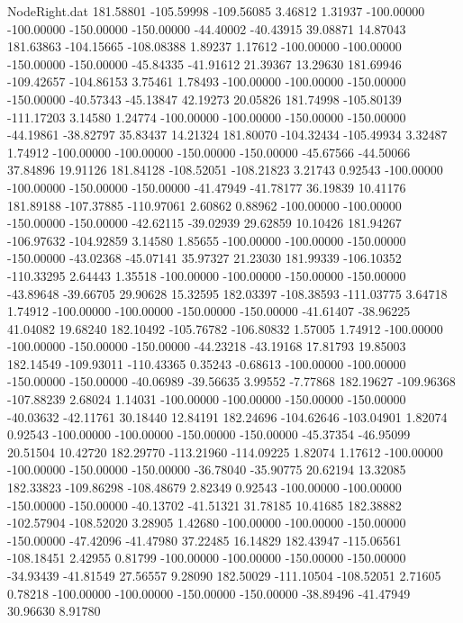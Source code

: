 \begin{filecontents}{NodeRight.dat}
 181.58801 -105.59998 -109.56085     3.46812    1.31937 -100.00000 -100.00000 -150.00000 -150.00000  -44.40002  -40.43915   39.08871   14.87043
 181.63863 -104.15665 -108.08388     1.89237    1.17612 -100.00000 -100.00000 -150.00000 -150.00000  -45.84335  -41.91612   21.39367   13.29630
 181.69946 -109.42657 -104.86153     3.75461    1.78493 -100.00000 -100.00000 -150.00000 -150.00000  -40.57343  -45.13847   42.19273   20.05826
 181.74998 -105.80139 -111.17203     3.14580    1.24774 -100.00000 -100.00000 -150.00000 -150.00000  -44.19861  -38.82797   35.83437   14.21324
 181.80070 -104.32434 -105.49934     3.32487    1.74912 -100.00000 -100.00000 -150.00000 -150.00000  -45.67566  -44.50066   37.84896   19.91126
 181.84128 -108.52051 -108.21823     3.21743    0.92543 -100.00000 -100.00000 -150.00000 -150.00000  -41.47949  -41.78177   36.19839   10.41176
 181.89188 -107.37885 -110.97061     2.60862    0.88962 -100.00000 -100.00000 -150.00000 -150.00000  -42.62115  -39.02939   29.62859   10.10426
 181.94267 -106.97632 -104.92859     3.14580    1.85655 -100.00000 -100.00000 -150.00000 -150.00000  -43.02368  -45.07141   35.97327   21.23030
 181.99339 -106.10352 -110.33295     2.64443    1.35518 -100.00000 -100.00000 -150.00000 -150.00000  -43.89648  -39.66705   29.90628   15.32595
 182.03397 -108.38593 -111.03775     3.64718    1.74912 -100.00000 -100.00000 -150.00000 -150.00000  -41.61407  -38.96225   41.04082   19.68240
 182.10492 -105.76782 -106.80832     1.57005    1.74912 -100.00000 -100.00000 -150.00000 -150.00000  -44.23218  -43.19168   17.81793   19.85003
 182.14549 -109.93011 -110.43365     0.35243   -0.68613 -100.00000 -100.00000 -150.00000 -150.00000  -40.06989  -39.56635    3.99552   -7.77868
 182.19627 -109.96368 -107.88239     2.68024    1.14031 -100.00000 -100.00000 -150.00000 -150.00000  -40.03632  -42.11761   30.18440   12.84191
 182.24696 -104.62646 -103.04901     1.82074    0.92543 -100.00000 -100.00000 -150.00000 -150.00000  -45.37354  -46.95099   20.51504   10.42720
 182.29770 -113.21960 -114.09225     1.82074    1.17612 -100.00000 -100.00000 -150.00000 -150.00000  -36.78040  -35.90775   20.62194   13.32085
 182.33823 -109.86298 -108.48679     2.82349    0.92543 -100.00000 -100.00000 -150.00000 -150.00000  -40.13702  -41.51321   31.78185   10.41685
 182.38882 -102.57904 -108.52020     3.28905    1.42680 -100.00000 -100.00000 -150.00000 -150.00000  -47.42096  -41.47980   37.22485   16.14829
 182.43947 -115.06561 -108.18451     2.42955    0.81799 -100.00000 -100.00000 -150.00000 -150.00000  -34.93439  -41.81549   27.56557    9.28090
 182.50029 -111.10504 -108.52051     2.71605    0.78218 -100.00000 -100.00000 -150.00000 -150.00000  -38.89496  -41.47949   30.96630    8.91780

\end{filecontents}
